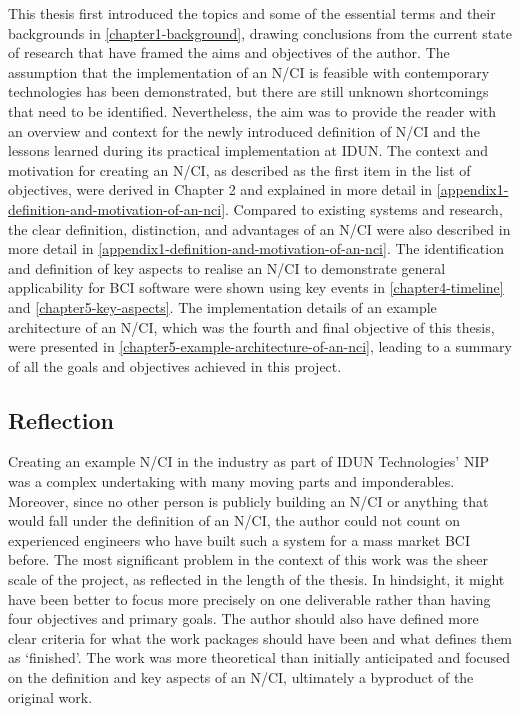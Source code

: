This thesis first introduced the topics and some of the essential terms and their backgrounds in \autoref{chapter1-background}, drawing conclusions from the current state of research that have framed the aims and objectives of the author. The assumption that the implementation of an N/CI is feasible with contemporary technologies has been demonstrated, but there are still unknown shortcomings that need to be identified. Nevertheless, the aim was to provide the reader with an overview and context for the newly introduced definition of N/CI and the lessons learned during its practical implementation at IDUN. The context and motivation for creating an N/CI, as described as the first item in the list of objectives, were derived in Chapter 2 and explained in more detail in \autoref{appendix1-definition-and-motivation-of-an-nci}. Compared to existing systems and research, the clear definition, distinction, and advantages of an N/CI were also described in more detail in \autoref{appendix1-definition-and-motivation-of-an-nci}. The identification and definition of key aspects to realise an N/CI to demonstrate general applicability for BCI software were shown using key events in \autoref{chapter4-timeline} and \autoref{chapter5-key-aspects}. The implementation details of an example architecture of an N/CI, which was the fourth and final objective of this thesis, were presented in \autoref{chapter5-example-architecture-of-an-nci}, leading to a summary of all the goals and objectives achieved in this project.

\subsection{Reflection}
\label{chapter5-reflection}

Creating an example N/CI in the industry as part of IDUN Technologies’ NIP was a complex undertaking with many moving parts and imponderables. Moreover, since no other person is publicly building an N/CI or anything that would fall under the definition of an N/CI, the author could not count on experienced engineers who have built such a system for a mass market BCI before. The most significant problem in the context of this work was the sheer scale of the project, as reflected in the length of the thesis. In hindsight, it might have been better to focus more precisely on one deliverable rather than having four objectives and primary goals. The author should also have defined more clear criteria for what the work packages should have been and what defines them as ‘finished’. The work was more theoretical than initially anticipated and focused on the definition and key aspects of an N/CI, ultimately a byproduct of the original work.

